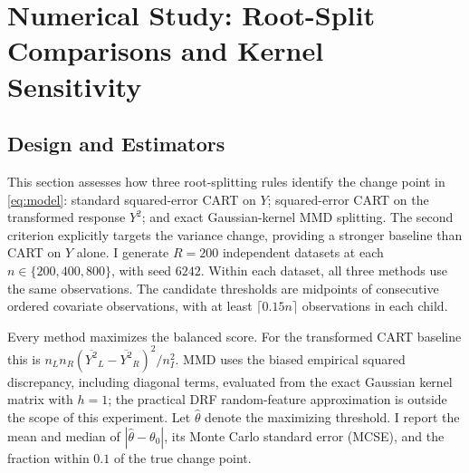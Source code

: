 \documentclass[12pt,a4paper]{article}
\newcommand{\1}{\mathbf 1}
\begin{document}
\section{Numerical Study: Root-Split Comparisons and Kernel Sensitivity}\label{sec:simulation}
\subsection{Design and Estimators}
This section assesses how three root-splitting rules identify the change point in \eqref{eq:model}: standard squared-error CART on $Y$; squared-error CART on the transformed response $Y^2$; and exact Gaussian-kernel MMD splitting. The second criterion explicitly targets the variance change, providing a stronger baseline than CART on $Y$ alone. I generate $R=200$ independent datasets at each $n\in\{200,400,800\}$, with seed $6242$. Within each dataset, all three methods use the same observations. The candidate thresholds are midpoints of consecutive ordered covariate observations, with at least $\lceil0.15n\rceil$ observations in each child.

Every method maximizes the balanced score. For the transformed CART baseline this is $n_Ln_R(\overline{Y^2}_L-\overline{Y^2}_R)^2/n_I^2$. MMD uses the biased empirical squared discrepancy, including diagonal terms, evaluated from the exact Gaussian kernel matrix with $h=1$; the practical DRF random-feature approximation is outside the scope of this experiment. Let $\widehat\theta$ denote the maximizing threshold. I report the mean and median of $|\widehat\theta-\theta_0|$, its Monte Carlo standard error (MCSE), and the fraction within $0.1$ of the true change point.
\end{document}
